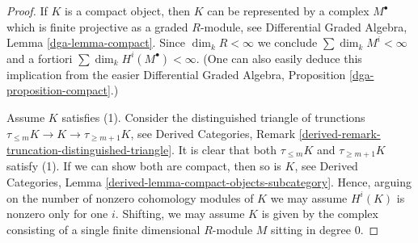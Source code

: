 \begin{proof}
If $K$ is a compact object, then $K$ can be represented by a complex
$M^\bullet$ which is finite projective as a graded $R$-module, see
Differential Graded Algebra, Lemma \ref{dga-lemma-compact}.
Since $\dim_k R < \infty$ we conclude $\sum \dim_k M^i < \infty$
and a fortiori $\sum \dim_k H^i(M^\bullet) < \infty$.
(One can also easily deduce this implication from the easier
Differential Graded Algebra, Proposition \ref{dga-proposition-compact}.)

\medskip\noindent
Assume $K$ satisfies (1). Consider the distinguished triangle
of trunctions $\tau_{\leq m}K \to K \to \tau_{\geq m + 1}K$, see
Derived Categories, Remark
\ref{derived-remark-truncation-distinguished-triangle}.
It is clear that both $\tau_{\leq m}K$ and $\tau_{\geq m + 1} K$
satisfy (1). If we can show both are compact, then so is $K$, see
Derived Categories, Lemma \ref{derived-lemma-compact-objects-subcategory}.
Hence, arguing on the number of nonzero cohomology modules of $K$
we may assume $H^i(K)$ is nonzero only for one $i$.
Shifting, we may assume $K$ is given by the complex
consisting of a single finite dimensional $R$-module $M$ sitting
in degree $0$.


\end{proof}
